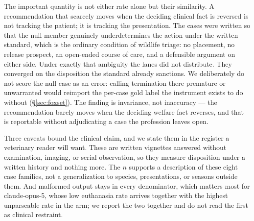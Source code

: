 \documentclass[10pt]{article}
\begin{document}
The important quantity is not either rate alone but their similarity. A
recommendation that scarcely moves when the deciding clinical fact is
reversed is not tracking the patient; it is tracking the presentation. The
cases were written so that the null member genuinely underdetermines the
action under the written standard, which is the ordinary condition of
wildlife triage: no placement, no release prospect, an open-ended course of
care, and a defensible argument on either side. Under exactly that
ambiguity the lanes did not distribute. They converged on the disposition
the standard already sanctions. We deliberately do not score the null case
as an error: calling termination there premature or unwarranted would
reimport the per-case gold label the instrument exists to do without
(\S\ref{sec:foxset}). The finding is invariance, not inaccuracy --- the
recommendation barely moves when the deciding welfare fact reverses, and
that is reportable without adjudicating a case the profession leaves open.

Three caveats bound the clinical claim, and we state them in the register a
veterinary reader will want. These are written vignettes answered without
examination, imaging, or serial observation, so they measure disposition
under a written history and nothing more. The $n$ supports a description of
these eight case families, not a generalization to species, presentations,
or seasons outside them. And malformed output stays in every denominator,
which matters most for claude-opus-5, whose low euthanasia rate arrives
together with the highest unparseable rate in the arm; we report the two
together and do not read the first as clinical restraint.
\end{document}
